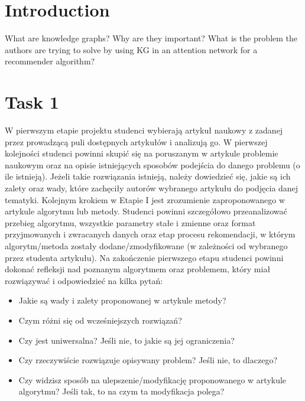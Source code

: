 \documentclass[a4paper]{LTJournalArticle}
\begin{document}
		
		
	\section{Introduction}
	What are knowledge graphs? Why are they important? What is the problem the authors are trying to solve by using KG in an attention network for a recommender algorithm?

	\section{Task 1}
	W pierwszym etapie projektu studenci wybierają artykuł naukowy
	z zadanej przez prowadzącą puli dostępnych artykułów i analizują go.
	W pierwszej kolejności studenci powinni skupić się na poruszanym w artykule
	problemie naukowym oraz na opisie istniejących sposobów podejścia do
	danego problemu (o ile istnieją). Jeżeli takie rozwiązania istnieją, należy
	dowiedzieć się, jakie są ich zalety oraz wady, które zachęciły autorów
	wybranego artykułu do podjęcia danej tematyki.
	Kolejnym krokiem w Etapie I jest zrozumienie zaproponowanego
	w artykule algorytmu lub metody. Studenci powinni szczegółowo przeanalizować
	przebieg algorytmu, wszystkie parametry stałe i zmienne oraz format
	przyjmowanych i zwracanych danych oraz etap procesu rekomendacji, w którym
	algorytm/metoda zostały dodane/zmodyfikowane (w zależności od wybranego
	przez studenta artykułu).
	Na zakończenie pierwszego etapu studenci powinni dokonać refleksji nad
	poznanym algorytmem oraz problemem, który miał rozwiązywać i odpowiedzieć
	na kilka pytań:
	\begin{itemize}
		\item Jakie są wady i zalety proponowanej w artykule metody?
		\item Czym różni się od wcześniejszych rozwiązań?
		\item Czy jest uniwersalna? Jeśli nie, to jakie są jej ograniczenia?
		\item Czy rzeczywiście rozwiązuje opisywany problem? Jeśli nie, to dlaczego?
		\item Czy widzisz sposób na ulepszenie/modyfikację proponowanego w artykule algorytmu? Jeśli tak, to na czym ta modyfikacja polega?
	\end{itemize}
\end{document}
